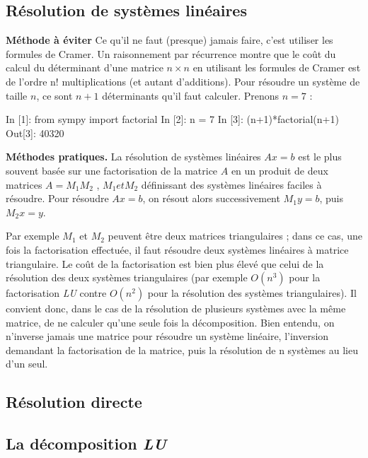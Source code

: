 \subsection{Résolution de systèmes linéaires}
 \begin{flushleft}
 \textbf{Méthode à éviter} Ce qu'il ne faut (presque) jamais faire, c'est utiliser les formules de Cramer. Un raisonnement par récurrence montre que le coût du calcul du déterminant d'une matrice $n \times n$ en utilisant les formules de Cramer est de
l'ordre n! multiplications (et autant d'additions). Pour résoudre un système de taille $n$, ce sont $n + 1$ déterminants qu'il faut calculer. Prenons $n = 7$ :
\end{flushleft}
\begin{python}
In [1]: from sympy import factorial
In [2]: n = 7
In [3]: (n+1)*factorial(n+1)
Out[3]: 40320
 \end{python}
 \begin{flushleft}
  \textbf{Méthodes pratiques.} La résolution de systèmes linéaires $Ax = b$ est le plus souvent basée sur une factorisation de la matrice $A$ en un produit de deux matrices $A = M_{1}M_{2}$ , $M_{1} et M_{2}$ définissant des systèmes linéaires faciles à résoudre. Pour résoudre $Ax = b$, on résout alors successivement $M_{1}y = b$, puis $M_{2}x = y$.
 
 Par exemple $M_{1}$ et $M_{2}$ peuvent être deux matrices triangulaires ; dans ce cas, une fois la factorisation effectuée, il faut résoudre deux systèmes linéaires à matrice triangulaire. Le coût de la factorisation est bien plus élevé que celui de la résolution des deux systèmes triangulaires (par exemple $O\left(n^{3}\right)$ pour la factorisation \textit{LU} contre $O\left(n^{2}\right)$ pour la résolution des systèmes triangulaires). Il convient donc, dans le cas de la résolution de plusieurs systèmes avec la même matrice, de ne calculer qu'une seule fois la décomposition. Bien entendu, on n'inverse jamais une matrice pour résoudre un système linéaire, l'inversion demandant la factorisation de la matrice, puis la résolution de n systèmes au lieu d'un seul.
 \end{flushleft}
\subsection{Résolution directe}
\subsection{La décomposition \textit{LU}}
\begin{exercise}
\end{exercise}
\begin{exercise}

\end{exercise}
